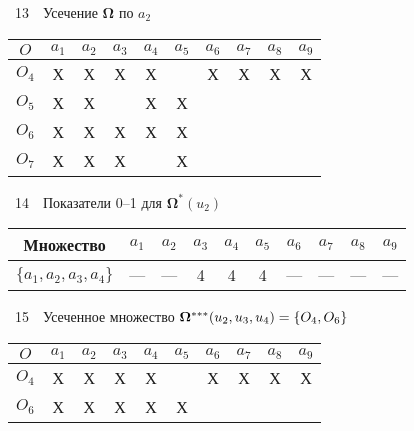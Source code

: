 \begin{multicols}{2}
\vspace*{3pt}

\noindent
{\small
 \begin{center}  %
{{\tablename~13}\ \ \small{Усечение ${\boldsymbol{\Omega}}$ по $a_2$}}

\vspace*{2ex}

    \begin{tabular}{|c|c|c|c|c|c|c|c|c|c|}
\hline
$O$&\cellcolor[gray]{.6}$a_1$&\cellcolor[gray]{.6}$a_2$&$a_3$&$a_4$&$a_5$&$a_6$&$a_7$&$a_8$&$a_9$\\
\hline
$O_4$&\cellcolor[gray]{.6}Х&\cellcolor[gray]{.6}Х&Х&Х&&Х&Х&Х&Х\\
$O_5$&\cellcolor[gray]{.6}Х&\cellcolor[gray]{.6}Х&&Х&Х&&&&\\
$O_6$&\cellcolor[gray]{.6}Х&\cellcolor[gray]{.6}Х&Х&Х&Х&&&&\\
$O_7$&\cellcolor[gray]{.6}Х&\cellcolor[gray]{.6}Х&Х&&Х&&&&\\
\hline
\end{tabular}
\end{center}
}

\columnbreak



\noindent
{\small
 \begin{center}  %
{{\tablename~14}\ \ \small{Показатели 0--1 для ${\boldsymbol{\Omega}}^*(u_2)$}}

\vspace*{2ex}

\tabcolsep=4pt
    \begin{tabular}{|c|c|c|c|c|c|c|c|c|c|}
\hline
Множество&$a_1$&$a_2$&\cellcolor[gray]{.6}$a_3$&$a_4$&$a_5$&$a_6$&$a_7$&$a_8$&$a_9$\\
\hline
$\{a_1,a_2,a_3,a_4\}$&---&---&\cellcolor[gray]{.6}4&4&4&---&---&---&---\\
\hline
\end{tabular}
\end{center}
}

\vspace*{6pt}


\noindent
{\small
 \begin{center}  %
\parbox{78mm}{{\tablename~15}\ \ \small{Усеченное множество ${\boldsymbol{\Omega}}^{***}
(u_2, u_3, u_4)\hm = \{O_4, O_6\}$}}

\vspace*{2ex}

   \tabcolsep=6.3pt
    \begin{tabular}{|c|c|c|c|c|c|c|c|c|c|}
\hline
$O$&\cellcolor[gray]{.6}$a_1$&\cellcolor[gray]{.6}$a_2$&
\cellcolor[gray]{.6}$a_3$&\cellcolor[gray]{.6}$a_4$&$a_5$&$a_6$&$a_7$&$a_8$&$a_9$\\
\hline
$O_4$&\cellcolor[gray]{.6}Х&\cellcolor[gray]{.6}Х&\cellcolor[gray]{.6}Х&\cellcolor[gray]{.6}Х&&Х&Х&Х&Х\\
$O_6$&\cellcolor[gray]{.6}Х&\cellcolor[gray]{.6}Х&\cellcolor[gray]{.6}Х&\cellcolor[gray]{.6}Х&Х&&&&\\
\hline
\end{tabular}
\end{center}
}


\end{multicols}
